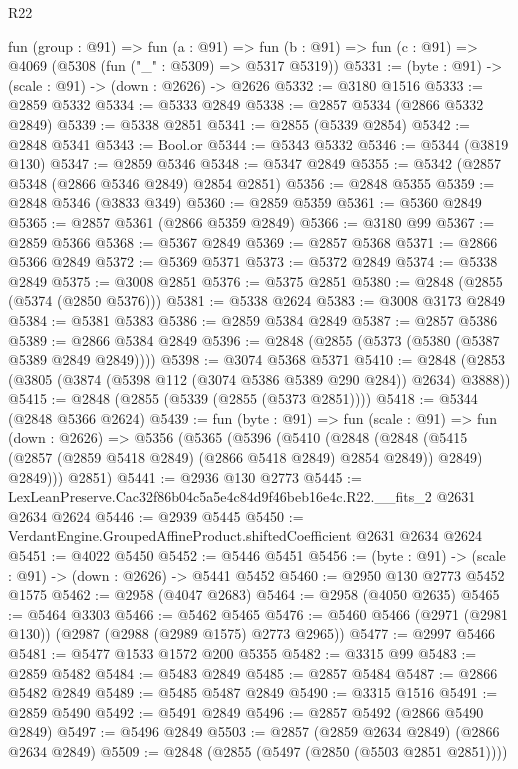 \begin{lexlean}{R22}
\begin{coremodule}
  fun (group : @91) =>
  fun (a : @91) =>
  fun (b : @91) => fun (c : @91) => @4069 (@5308 (fun ("_" : @5309) => @5317 @5319))
@5331 := (byte : @91) -> (scale : @91) -> (down : @2626) -> @2626
@5332 := @3180 @1516
@5333 := @2859 @5332
@5334 := @5333 @2849
@5338 := @2857 @5334 (@2866 @5332 @2849)
@5339 := @5338 @2851
@5341 := @2855 (@5339 @2854)
@5342 := @2848 @5341
@5343 := Bool.or
@5344 := @5343 @5332
@5346 := @5344 (@3819 @130)
@5347 := @2859 @5346
@5348 := @5347 @2849
@5355 := @5342 (@2857 @5348 (@2866 @5346 @2849) @2854 @2851)
@5356 := @2848 @5355
@5359 := @2848 @5346 (@3833 @349)
@5360 := @2859 @5359
@5361 := @5360 @2849
@5365 := @2857 @5361 (@2866 @5359 @2849)
@5366 := @3180 @99
@5367 := @2859 @5366
@5368 := @5367 @2849
@5369 := @2857 @5368
@5371 := @2866 @5366 @2849
@5372 := @5369 @5371
@5373 := @5372 @2849
@5374 := @5338 @2849
@5375 := @3008 @2851
@5376 := @5375 @2851
@5380 := @2848 (@2855 (@5374 (@2850 @5376)))
@5381 := @5338 @2624
@5383 := @3008 @3173 @2849
@5384 := @5381 @5383
@5386 := @2859 @5384 @2849
@5387 := @2857 @5386
@5389 := @2866 @5384 @2849
@5396 := @2848 (@2855 (@5373 (@5380 (@5387 @5389 @2849 @2849))))
@5398 := @3074 @5368 @5371
@5410 := @2848 (@2853 (@3805 (@3874 (@5398 @112 (@3074 @5386 @5389 @290 @284)) @2634) @3888))
@5415 := @2848 (@2855 (@5339 (@2855 (@5373 @2851))))
@5418 := @5344 (@2848 @5366 @2624)
@5439 := fun (byte : @91) =>
  fun (scale : @91) =>
  fun (down : @2626) =>
  @5356
    (@5365
      (@5396
        (@5410
          (@2848
            (@2848 (@5415 (@2857 (@2859 @5418 @2849) (@2866 @5418 @2849) @2854 @2849)) @2849)
            @2849)))
      @2851)
@5441 := @2936 @130 @2773
@5445 := LexLeanPreserve.Cac32f86b04c5a5e4c84d9f46beb16e4c.R22.__fits_2 @2631 @2634 @2624
@5446 := @2939 @5445
@5450 := VerdantEngine.GroupedAffineProduct.shiftedCoefficient @2631 @2634 @2624
@5451 := @4022 @5450
@5452 := @5446 @5451
@5456 := (byte : @91) -> (scale : @91) -> (down : @2626) -> @5441 @5452
@5460 := @2950 @130 @2773 @5452 @1575
@5462 := @2958 (@4047 @2683)
@5464 := @2958 (@4050 @2635)
@5465 := @5464 @3303
@5466 := @5462 @5465
@5476 := @5460 @5466 (@2971 (@2981 @130)) (@2987 (@2988 (@2989 @1575) @2773 @2965))
@5477 := @2997 @5466
@5481 := @5477 @1533 @1572 @200 @5355
@5482 := @3315 @99
@5483 := @2859 @5482
@5484 := @5483 @2849
@5485 := @2857 @5484
@5487 := @2866 @5482 @2849
@5489 := @5485 @5487 @2849
@5490 := @3315 @1516
@5491 := @2859 @5490
@5492 := @5491 @2849
@5496 := @2857 @5492 (@2866 @5490 @2849)
@5497 := @5496 @2849
@5503 := @2857 (@2859 @2634 @2849) (@2866 @2634 @2849)
@5509 := @2848 (@2855 (@5497 (@2850 (@5503 @2851 @2851))))

\end{coremodule}
\end{lexlean}
